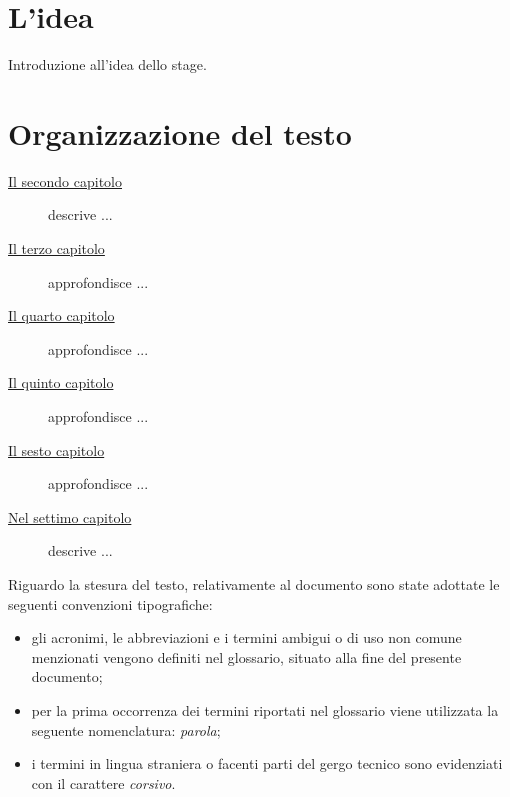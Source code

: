 \section{L'idea}

Introduzione all'idea dello stage.

\section{Organizzazione del testo}

\begin{description}
    \item[{\hyperref[cap:processi-metodologie]{Il secondo capitolo}}] descrive ...
    
    \item[{\hyperref[cap:descrizione-stage]{Il terzo capitolo}}] approfondisce ...
    
    \item[{\hyperref[cap:analisi-requisiti]{Il quarto capitolo}}] approfondisce ...
    
    \item[{\hyperref[cap:progettazione-codifica]{Il quinto capitolo}}] approfondisce ...
    
    \item[{\hyperref[cap:verifica-validazione]{Il sesto capitolo}}] approfondisce ...
    
    \item[{\hyperref[cap:conclusioni]{Nel settimo capitolo}}] descrive ...
\end{description}

Riguardo la stesura del testo, relativamente al documento sono state adottate le seguenti convenzioni tipografiche:
\begin{itemize}
	\item gli acronimi, le abbreviazioni e i termini ambigui o di uso non comune menzionati vengono definiti nel glossario, situato alla fine del presente documento;
	\item per la prima occorrenza dei termini riportati nel glossario viene utilizzata la seguente nomenclatura: \emph{parola}\glsfirstoccur;
	\item i termini in lingua straniera o facenti parti del gergo tecnico sono evidenziati con il carattere \emph{corsivo}.
\end{itemize}
